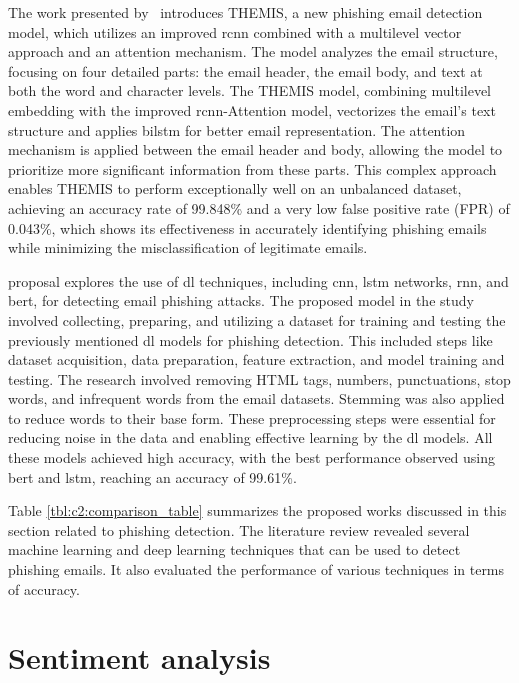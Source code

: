 The work presented by~\citet{8701426} introduces THEMIS, a new phishing email detection model, which utilizes an improved \ac{rcnn} combined with a multilevel vector approach and an attention mechanism. The model analyzes the email structure, focusing on four detailed parts: the email header, the email body, and text at both the word and character levels.
The THEMIS model, combining multilevel embedding with the improved \ac{rcnn}-Attention model, vectorizes the email's text structure and applies \ac{bilstm} for better email representation. The attention mechanism is applied between the email header and body, allowing the model to prioritize more significant information from these parts. This complex approach enables THEMIS to perform exceptionally well on an unbalanced dataset, achieving an accuracy rate of 99.848\% and a very low false positive rate (FPR) of 0.043\%, which shows its effectiveness in accurately identifying phishing emails while minimizing the misclassification of legitimate emails.

\citet{atawneh2023phishing} proposal explores the use of \ac{dl} techniques, including \ac{cnn}, \ac{lstm} networks, \ac{rnn}, and \ac{bert}, for detecting email phishing attacks. The proposed model in the study involved collecting, preparing, and utilizing a dataset for training and testing the previously mentioned \ac{dl} models for phishing detection. This included steps like dataset acquisition, data preparation, feature extraction, and model training and testing. The research involved removing HTML tags, numbers, punctuations, stop words, and infrequent words from the email datasets. Stemming was also applied to reduce words to their base form. These preprocessing steps were essential for reducing noise in the data and enabling effective learning by the \ac{dl} models. All these models achieved high accuracy, with the best performance observed using \ac{bert} and \ac{lstm}, reaching an accuracy of 99.61\%.

Table \ref{tbl:c2:comparison_table} summarizes the proposed works discussed in this section related to phishing detection. The literature review revealed several machine learning and deep learning techniques that can be used to detect phishing emails. It also evaluated the performance of various techniques in terms of accuracy.



\section{Sentiment analysis}

